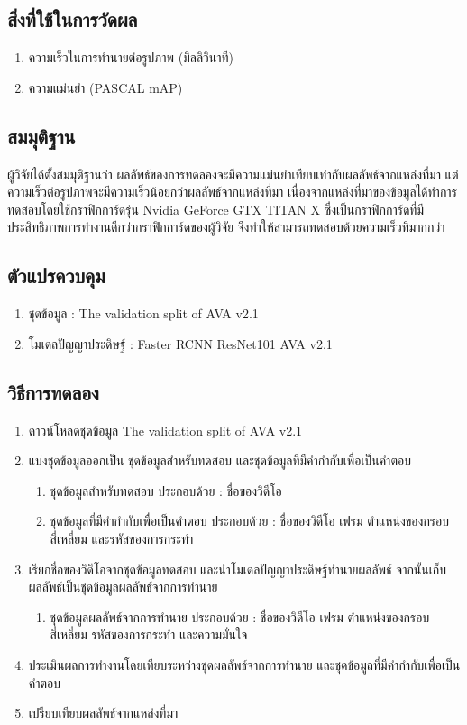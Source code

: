 \subsection*{สิ่งที่ใช้ในการวัดผล}
	\begin{enumerate}
		\setlength\itemsep{-0.25em}
		\item ความเร็วในการทำนายต่อรูปภาพ (มิลลิวินาที)
		\item ความแม่นยำ (PASCAL mAP)
	\end{enumerate}
\subsection*{สมมุติฐาน}
ผู้วิจัยได้ตั้งสมมุติฐานว่า ผลลัพธ์ของการทดลองจะมีความแม่นยำเทียบเท่ากับผลลัพธ์จากแหล่งที่มา แต่ความเร็วต่อรูปภาพจะมีความเร็วน้อยกว่าผลลัพธ์จากแหล่งที่มา 
เนื่องจากแหล่งที่มาของข้อมูลได้ทำการทดสอบโดยใช้กราฟิกการ์ดรุ่น Nvidia GeForce GTX TITAN X ซึ่งเป็นกราฟิกการ์ดที่มีประสิทธิภาพการทำงานดีกว่ากราฟิกการ์ดของผู้วิจัย จึงทำให้สามารถทดสอบด้วยความเร็วที่มากกว่า
\subsection*{ตัวแปรควบคุม}
	\begin{enumerate}
		\setlength\itemsep{-0.25em}
		\item ชุดข้อมูล : The validation split of AVA v2.1
		\item โมเดลปัญญาประดิษฐ์ : Faster RCNN ResNet101 AVA v2.1
	\end{enumerate}
\subsection*{วิธีการทดลอง}
	\begin{enumerate}
		\setlength\itemsep{-0.25em}
		\item ดาวน์โหลดชุดข้อมูล The validation split of AVA v2.1
		\item แบ่งชุดข้อมูลออกเป็น ชุดข้อมูลสำหรับทดสอบ และชุดข้อมูลที่มีคำกำกับเพื่อเป็นคำตอบ
			\begin{enumerate}
				\setlength\itemsep{-0.25em}
				\item ชุดข้อมูลสำหรับทดสอบ ประกอบด้วย : ชื่อของวิดีโอ
				\item ชุดข้อมูลที่มีคำกำกับเพื่อเป็นคำตอบ ประกอบด้วย : ชื่อของวิดีโอ เฟรม ตำแหน่งของกรอบสี่เหลี่ยม และรหัสของการกระทำ
			\end{enumerate}
		\item เรียกชื่อของวิดีโอจากชุดข้อมูลทดสอบ และนำโมเดลปัญญาประดิษฐ์ทำนายผลลัพธ์ จากนั้นเก็บผลลัพธ์เป็นชุดข้อมูลผลลัพธ์จากการทำนาย
			\begin{enumerate}
				\setlength\itemsep{-0.25em}
				\item ชุดข้อมูลผลลัพธ์จากการทำนาย ประกอบด้วย : ชื่อของวิดีโอ เฟรม ตำแหน่งของกรอบสี่เหลี่ยม รหัสของการกระทำ และความมั่นใจ
			\end{enumerate}
		\item ประเมินผลการทำงานโดยเทียบระหว่างชุดผลลัพธ์จากการทำนาย และชุดข้อมูลที่มีคำกำกับเพื่อเป็นคำตอบ
		\item เปรียบเทียบผลลัพธ์จากแหล่งที่มา
\end{enumerate}
\clearpage
